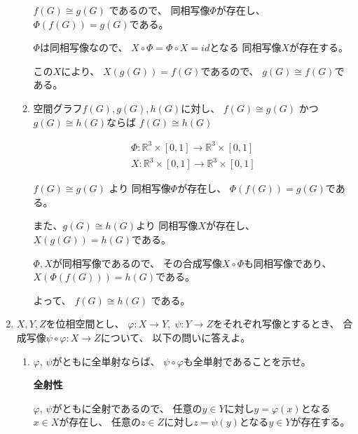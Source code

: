 \documentclass[12pt,b5paper]{ltjsarticle}
\begin{document}
\begin{enumerate}
\begin{enumerate}
            $f(G) \cong g(G)$
            であるので、
            同相写像$\Phi$が存在し、
            $\Phi(f(G))=g(G)$である。

            $\Phi$は同相写像なので、
            $X \circ \Phi = \Phi \circ X =id$となる
            同相写像$X$が存在する。

            この$X$により、
            $X(g(G)) = f(G)$であるので、
            $g(G) \cong f(G)$である。

            \hrulefill

       \item
            空間グラフ$f(G),g(G),h(G)$に対し、
            $f(G) \cong g(G)$ かつ $g(G) \cong h(G)$ならば
            $f(G) \cong h(G)$

            \dotfill

            \begin{gather}
             \Phi : \mathbb{R}^{3}\times [0,1] \to \mathbb{R}^{3}\times [0,1]\\
             X : \mathbb{R}^{3}\times [0,1] \to \mathbb{R}^{3}\times [0,1]
            \end{gather}

            $f(G) \cong g(G)$ より
            同相写像$\Phi$が存在し、
            $\Phi(f(G))=g(G)$である。
            
            また、$g(G) \cong h(G)$より
            同相写像$X$が存在し、
            $X(g(G))=h(G)$である。

            $\Phi,X$が同相写像であるので、
            その合成写像$X\circ \Phi$も同相写像であり、
            $X(\Phi(f(G)))=h(G)$である。

            よって、
            $f(G) \cong h(G)$
            である。

            \hrulefill

      \end{enumerate}


 \item
      $X,Y,Z$を位相空間とし、
      $\varphi:X\to Y,\; \psi:Y\to Z$をそれぞれ写像とするとき、
      合成写像$\psi\circ\varphi:X\to Z$について、
      以下の問いに答えよ。
      \begin{enumerate}
       \item
            $\varphi,\,\psi$がともに全単射ならば、
            $\psi\circ\varphi$も全単射であることを示せ。

            \dotfill

            \textbf{全射性}

            $\varphi,\,\psi$がともに全射であるので、
            任意の$y \in Y$に対し$y=\varphi(x)$となる$x\in X$が存在し、
            任意の$z \in Z$に対し$z=\psi(y)$となる$y\in Y$が存在する。


\end{enumerate}
\end{enumerate}
\end{document}
